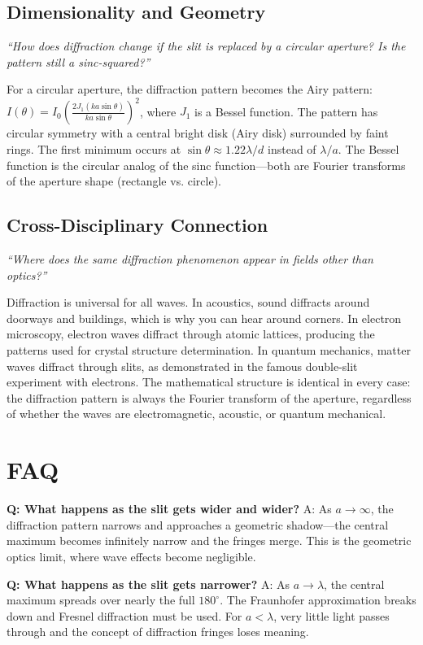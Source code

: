 \subsection*{Dimensionality and Geometry}
\textit{``How does diffraction change if the slit is replaced by a circular aperture? Is the pattern still a sinc-squared?''}

For a circular aperture, the diffraction pattern becomes the Airy pattern: $I(\theta) = I_0\left(\frac{2J_1(ka\sin\theta)}{ka\sin\theta}\right)^2$, where $J_1$ is a Bessel function. The pattern has circular symmetry with a central bright disk (Airy disk) surrounded by faint rings. The first minimum occurs at $\sin\theta \approx 1.22\lambda/d$ instead of $\lambda/a$. The Bessel function is the circular analog of the sinc function---both are Fourier transforms of the aperture shape (rectangle vs. circle).

\subsection*{Cross-Disciplinary Connection}
\textit{``Where does the same diffraction phenomenon appear in fields other than optics?''}

Diffraction is universal for all waves. In acoustics, sound diffracts around doorways and buildings, which is why you can hear around corners. In electron microscopy, electron waves diffract through atomic lattices, producing the patterns used for crystal structure determination. In quantum mechanics, matter waves diffract through slits, as demonstrated in the famous double-slit experiment with electrons. The mathematical structure is identical in every case: the diffraction pattern is always the Fourier transform of the aperture, regardless of whether the waves are electromagnetic, acoustic, or quantum mechanical.

\section*{FAQ}

\textbf{Q: What happens as the slit gets wider and wider?}
A: As $a \to \infty$, the diffraction pattern narrows and approaches a geometric shadow---the central maximum becomes infinitely narrow and the fringes merge. This is the geometric optics limit, where wave effects become negligible.

\textbf{Q: What happens as the slit gets narrower?}
A: As $a \to \lambda$, the central maximum spreads over nearly the full $180^\circ$. The Fraunhofer approximation breaks down and Fresnel diffraction must be used. For $a < \lambda$, very little light passes through and the concept of diffraction fringes loses meaning.

